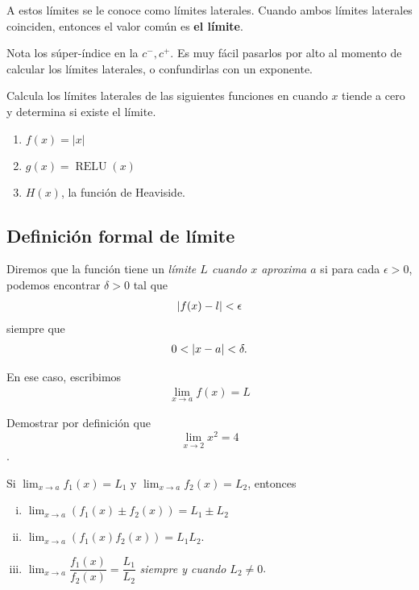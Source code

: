 \begin{observacion}
	A estos límites se le conoce como límites laterales. Cuando ambos límites laterales coinciden, entonces el valor común es \textbf{el límite}.
\end{observacion}

\begin{observacion}
	Nota los súper-índice en la $ c^{-}, c^{+} $. Es muy fácil pasarlos por alto al momento de calcular los límites laterales, o confundirlas con un exponente.
\end{observacion}

\begin{resuelto}
	Calcula los límites laterales de las siguientes funciones en cuando $ x $ tiende a cero y determina si existe el límite.
	\begin{enumerate}
		\item $ f(x) = |x| $
		\item $ g(x) = \operatorname{RELU}(x) $
		\item $ H(x) $, la función de Heaviside.
	\end{enumerate}
\end{resuelto}

\subsection{Definición formal de límite}

\begin{definicion}

	Diremos que la función tiene un \emph{límite $L$ cuando $x$ aproxima $a$} si para cada $\epsilon >0$, podemos encontrar $\delta >0$ tal que
	\begin{align}
		\left|f(x)-l\right| < \epsilon
	\end{align}
	siempre que
	\begin{align}
		0 < \left|x-a\right| < \delta.
	\end{align}

 En ese caso, escribimos
\begin{align}
	\lim_{x \to a} f(x) = L
\end{align}
\end{definicion}


\begin{resuelto}
	Demostrar por definición que $$\lim_{x\to 2}x^2=4$$.
\end{resuelto}


\begin{proposicion}

	Si $\lim_{x \to a}f_{1}(x)= L_{1}$ y $\lim_{x \to a }f_{2}(x)= L_{2}$, entonces
	\begin{enumerate}[(i)]
		\item $\lim_{x\to a}\left( f_{1}(x)\pm f_{2}(x) \right) = L_{1}\pm L_{2}$
		\item $\lim_{x\to a}\left( f_{1}(x) f_{2}(x)\right)= L_{1}L_{2}$.
		\item
		$\lim_{x \to a}\dfrac{f_{1}(x)}{f_{2}(x)} = \dfrac{L_{1}}{L_{2}}$
		\emph{siempre y cuando $L_{2}\neq 0$}.
	\end{enumerate}
\end{proposicion}



